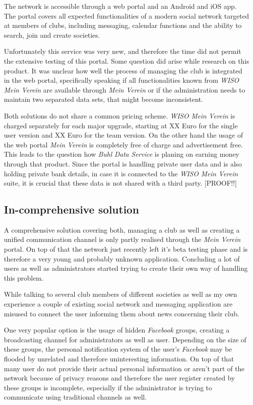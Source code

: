 The network is accessible through a web portal and an Android and iOS app. The portal covers all expected functionalities of a modern social network targeted at members of clubs, including messaging, calendar functions and the ability to search, join and create societies. 

Unfortunately this service was very new, and therefore the time did not permit the extensive testing of this portal. Some question did arise while research on this product. It was unclear how well the process of managing the club is integrated in the web portal, specifically speaking if all functionalities known from \emph{WISO Mein Verein} are available through \emph{Mein Verein} or if the administration needs to maintain two separated data sets, that might become inconsistent. 

Both solutions do not share a common pricing scheme. \emph{WISO Mein Verein} is charged separately for each major upgrade, starting at XX Euro for the single user version and XX Euro for the team version. On the other hand the usage of the web portal \emph{Mein Verein} is completely free of charge and advertisement free. This leads to the question how \emph{Buhl Data Service} is planing on earning money through that product. Since the portal is handling private user data and is also holding private bank details, in case it is connected to the \emph{WISO Mein Verein} suite, it is crucial that these data is not shared with a third party. [PROOF!!]

\subsection{In-comprehensive solution}

A comprehensive solution covering both, managing a club as well as creating a unified communication channel is only partly realised through the \emph{Mein Verein} portal. On top of that the network just recently left it's beta testing phase and is therefore a very young and probably unknown application. Concluding a lot of users as well as administrators started trying to create their own way of handling this problem. 

While talking to several club members of different societies as well as my own experience a couple of existing social network and messaging application are misused to connect the user informing them about news concerning their club. 

One very popular option is the usage of hidden \emph{Facebook} groups, creating a broadcasting channel for administrators as well as user. Depending on the size of these groups, the personal notification system of the user's \emph{Facebook} may be flooded by unrelated and therefore uninteresting information. On top of that many user do not provide their actual personal information or aren't part of the network because of privacy reasons and therefore the user register created by these groups is incomplete, especially if the administrator is trying to communicate using traditional channels as well. 

